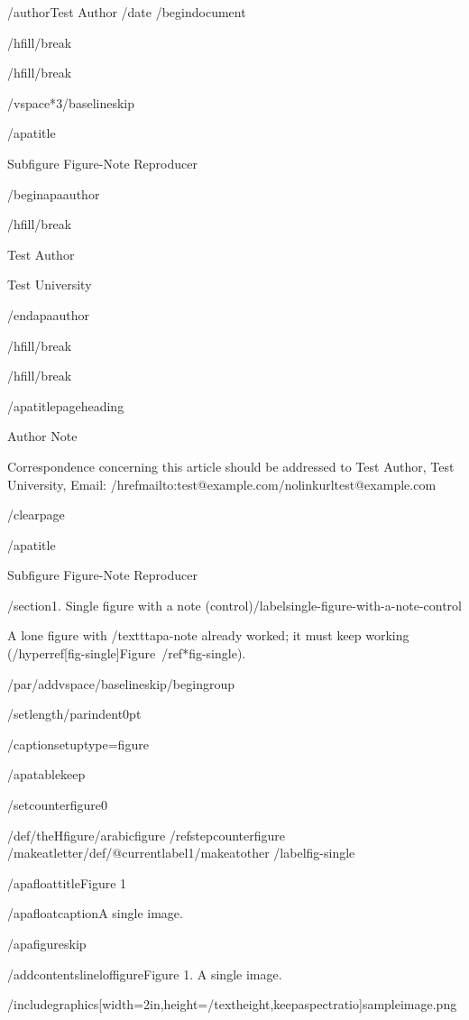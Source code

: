 /author{Test Author}
/date{}
/begin{document}


/hfill/break

/hfill/break

/vspace*{3/baselineskip}

/apatitle{

Subfigure Figure-Note Reproducer

}

/begin{apaauthor}

/hfill/break

Test Author

Test University

/end{apaauthor}

/hfill/break

/hfill/break

/apatitlepageheading{

Author Note

}

Correspondence concerning this article should be addressed to Test
Author, Test University, Email:
/href{mailto:test@example.com}{/nolinkurl{test@example.com}}

/clearpage

/apatitle{

Subfigure Figure-Note Reproducer

}

/section{1. Single figure with a note
(control)}/label{single-figure-with-a-note-control}

A lone figure with /texttt{apa-note} already worked; it must keep
working (/hyperref[fig-single]{Figure~/ref*{fig-single}}).

/par/addvspace{/baselineskip}/begingroup

/setlength{/parindent}{0pt}

/captionsetup{type=figure}

/apatablekeep

/setcounter{figure}{0}

/def/theHfigure{/arabic{figure}}%
/refstepcounter{figure}%
/makeatletter/def/@currentlabel{1}/makeatother%
/label{fig-single}

/apafloattitle{Figure 1}

/apafloatcaption{A single image.}

/apafigureskip

/addcontentsline{lof}{figure}{Figure 1. A single image.}

/includegraphics[width=2in,height=/textheight,keepaspectratio]{sampleimage.png}

